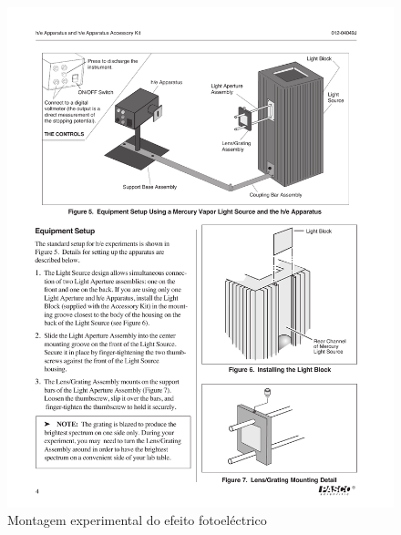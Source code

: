 \documentclass[a4paper,12pt]{article}  %
\begin{document}
\begin{figure}[htb] 
	\centering 
	\includegraphics[width=1.0\textwidth]{planckPasco} 
	\caption{Montagem experimental do efeito fotoeléctrico} 
	\label{fig:plackPasco}
\end{figure}


\end{document}
